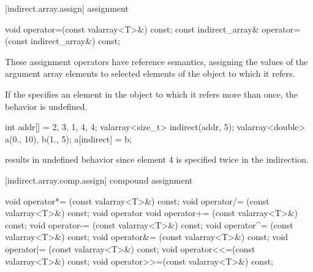 [indirect.array.assign]{ assignment}

%
\begin{itemdecl}
void operator=(const valarray<T>&) const;
const indirect_array& operator=(const indirect_array&) const;
\end{itemdecl}

\begin{itemdescr}
\pnum
These assignment operators have reference semantics, assigning the values
of the argument array elements to selected elements of the
object to which it refers.

\pnum
If the
specifies an element in the
object to which it refers more than once, the behavior is undefined.
%

\pnum
\begin{example}
\begin{codeblock}
int addr[] = {2, 3, 1, 4, 4};
valarray<size_t> indirect(addr, 5);
valarray<double> a(0., 10), b(1., 5);
a[indirect] = b;
\end{codeblock}
results in undefined behavior since element 4 is specified twice in the
indirection.
\end{example}
\end{itemdescr}

[indirect.array.comp.assign]{ compound assignment}

%
%
%
%
%
%
%
%
%
%
\begin{itemdecl}
void operator*= (const valarray<T>&) const;
void operator/= (const valarray<T>&) const;
void operator%
void operator+= (const valarray<T>&) const;
void operator-= (const valarray<T>&) const;
void operator^= (const valarray<T>&) const;
void operator&= (const valarray<T>&) const;
void operator|= (const valarray<T>&) const;
void operator<<=(const valarray<T>&) const;
void operator>>=(const valarray<T>&) const;
\end{itemdecl}

